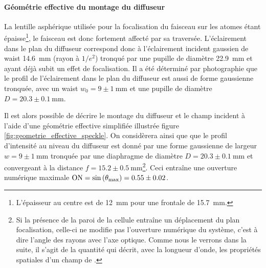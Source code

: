 \paragraph*{Géométrie effective du montage du diffuseur}

La lentille asphérique utilisée pour la focalisation du faisceau sur les atomes étant épaisse\footnote{L'épaisseur au centre est de \SI{12}{\milli\metre} pour une frontale de \SI{15.7}{\milli\metre}.}, le faisceau est donc fortement affecté par sa traversée. L'éclairement dans le plan du diffuseur correspond donc à l'éclairement incident gaussien de waist \SI{14.6}{\milli\metre} (rayon à $1/e^2$) tronqué par une pupille de diamètre \SI{22.9}{\milli\metre} et ayant déjà subit un effet de focalisation. Il a été déterminé par photographie que le profil de l'éclairement dans le plan du diffuseur est aussi de forme gaussienne tronquée, avec un waist $w_0=9\pm\SI{1}{\milli\metre}$ et une pupille de diamètre $D=20.3\pm\SI{0.1}{\milli\metre}$.

Il est alors possible de décrire le montage du diffuseur et le champ incident à l'aide d'une géométrie effective simplifiée illustrée figure \ref{fig:geometrie_effective_speckle}. On considèrera ainsi que que le profil d'intensité au niveau du diffuseur est donné par une forme gaussienne de largeur $w=9\pm\SI{1}{\milli\metre}$ tronquée par une diaphragme de diamètre $D=20.3\pm\SI{0.1}{\milli\metre}$ et convergeant à la distance $f=15.2\pm\SI{0.5}{\milli\metre}$\footnote{Si la présence de la paroi de la cellule entraîne un déplacement du plan focalisation, celle-ci ne modifie pas l'ouverture numérique du système, c'est à dire l'angle des rayons avec l'axe optique. Comme nous le verrons dans la suite, il s'agit de la quantité qui décrit, avec la longueur d'onde, les propriétés spatiales d'un champ de \speckle .}. Ceci entraîne une ouverture numérique maximale $\mathrm{ON}=\sin{(\theta_{\mathrm{max}})}=0.55\pm0.02$.

